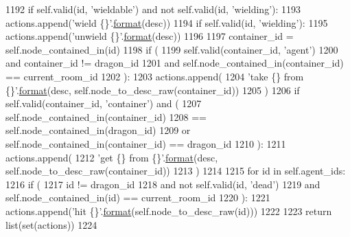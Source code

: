 \begin{DoxyCode}
1192                 \textcolor{keywordflow}{if} self.valid(id, \textcolor{stringliteral}{'wieldable'}) \textcolor{keywordflow}{and} \textcolor{keywordflow}{not} self.valid(id, \textcolor{stringliteral}{'wielding'}):
1193                     actions.append(\textcolor{stringliteral}{'wield \{\}'}.\hyperlink{namespaceparlai_1_1chat__service_1_1services_1_1messenger_1_1shared__utils_a32e2e2022b824fbaf80c747160b52a76}{format}(desc))
1194                 \textcolor{keywordflow}{if} self.valid(id, \textcolor{stringliteral}{'wielding'}):
1195                     actions.append(\textcolor{stringliteral}{'unwield \{\}'}.\hyperlink{namespaceparlai_1_1chat__service_1_1services_1_1messenger_1_1shared__utils_a32e2e2022b824fbaf80c747160b52a76}{format}(desc))
1196 
1197             container\_id = self.node\_contained\_in(id)
1198             \textcolor{keywordflow}{if} (
1199                 self.valid(container\_id, \textcolor{stringliteral}{'agent'})
1200                 \textcolor{keywordflow}{and} container\_id != dragon\_id
1201                 \textcolor{keywordflow}{and} self.node\_contained\_in(container\_id) == current\_room\_id
1202             ):
1203                 actions.append(
1204                     \textcolor{stringliteral}{'take \{\} from \{\}'}.\hyperlink{namespaceparlai_1_1chat__service_1_1services_1_1messenger_1_1shared__utils_a32e2e2022b824fbaf80c747160b52a76}{format}(desc, self.node\_to\_desc\_raw(container\_id))
1205                 )
1206             \textcolor{keywordflow}{if} self.valid(container\_id, \textcolor{stringliteral}{'container'}) \textcolor{keywordflow}{and} (
1207                 self.node\_contained\_in(container\_id)
1208                 == self.node\_contained\_in(dragon\_id)
1209                 \textcolor{keywordflow}{or} self.node\_contained\_in(container\_id) == dragon\_id
1210             ):
1211                 actions.append(
1212                     \textcolor{stringliteral}{'get \{\} from \{\}'}.\hyperlink{namespaceparlai_1_1chat__service_1_1services_1_1messenger_1_1shared__utils_a32e2e2022b824fbaf80c747160b52a76}{format}(desc, self.node\_to\_desc\_raw(container\_id))
1213                 )
1214 
1215         \textcolor{keywordflow}{for} id \textcolor{keywordflow}{in} self.agent\_ids:
1216             \textcolor{keywordflow}{if} (
1217                 id != dragon\_id
1218                 \textcolor{keywordflow}{and} \textcolor{keywordflow}{not} self.valid(id, \textcolor{stringliteral}{'dead'})
1219                 \textcolor{keywordflow}{and} self.node\_contained\_in(id) == current\_room\_id
1220             ):
1221                 actions.append(\textcolor{stringliteral}{'hit \{\}'}.\hyperlink{namespaceparlai_1_1chat__service_1_1services_1_1messenger_1_1shared__utils_a32e2e2022b824fbaf80c747160b52a76}{format}(self.node\_to\_desc\_raw(id)))
1222 
1223         \textcolor{keywordflow}{return} list(set(actions))
1224 
\end{DoxyCode}

